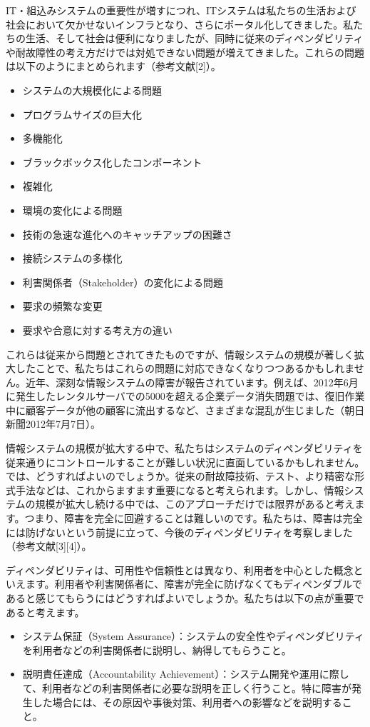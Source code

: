 IT・組込みシステムの重要性が増すにつれ、ITシステムは私たちの生活および社会において欠かせないインフラとなり、さらにポータル化してきました。私たちの生活、そして社会は便利になりましたが、同時に従来のディペンダビリティや耐故障性の考え方だけでは対処できない問題が増えてきました。これらの問題は以下のようにまとめられます（参考文献[2]）。
\begin{itemize}
\item システムの大規模化による問題
\item プログラムサイズの巨大化
\item 多機能化
\item ブラックボックス化したコンポーネント
\item 複雑化
\item 環境の変化による問題
\item 技術の急速な進化へのキャッチアップの困難さ
\item 接続システムの多様化
\item 利害関係者（Stakeholder）の変化による問題
\item 要求の頻繁な変更
\item 要求や合意に対する考え方の違い
\end{itemize}

これらは従来から問題とされてきたものですが、情報システムの規模が著しく拡大したことで、私たちはこれらの問題に対応できなくなりつつあるかもしれません。近年、深刻な情報システムの障害が報告されています。例えば、2012年6月に発生したレンタルサーバでの5000を超える企業データ消失問題では、復旧作業中に顧客データが他の顧客に流出するなど、さまざまな混乱が生じました（朝日新聞2012年7月7日）。

情報システムの規模が拡大する中で、私たちはシステムのディペンダビリティを従来通りにコントロールすることが難しい状況に直面しているかもしれません。では、どうすればよいのでしょうか。従来の耐故障技術、テスト、より精密な形式手法などは、これからますます重要になると考えられます。しかし、情報システムの規模が拡大し続ける中では、このアプローチだけでは限界があると考えます。つまり、障害を完全に回避することは難しいのです。私たちは、障害は完全には防げないという前提に立って、今後のディペンダビリティを考察しました（参考文献[3][4]）。

ディペンダビリティは、可用性や信頼性とは異なり、利用者を中心とした概念といえます。利用者や利害関係者に、障害が完全に防げなくてもディペンダブルであると感じてもらうにはどうすればよいでしょうか。私たちは以下の点が重要であると考えます。

\begin{itemize}
\item システム保証（System Assurance）：システムの安全性やディペンダビリティを利用者などの利害関係者に説明し、納得してもらうこと。
\item 説明責任達成（Accountability Achievement）：システム開発や運用に際して、利用者などの利害関係者に必要な説明を正しく行うこと。特に障害が発生した場合には、その原因や事後対策、利用者への影響などを説明すること。
\end{itemize}

